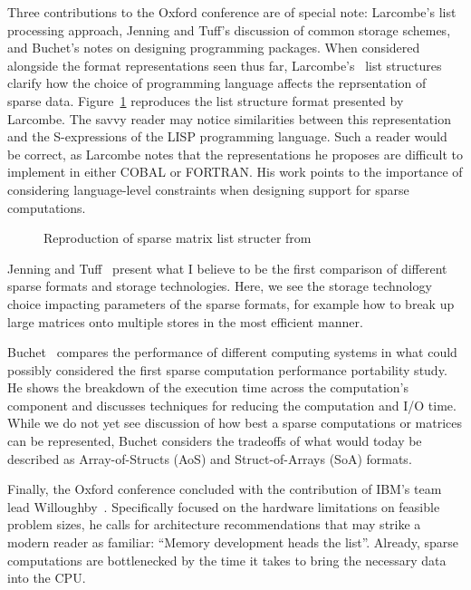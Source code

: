 Three contributions to the Oxford conference are of special note: Larcombe's list processing approach, Jenning and Tuff's discussion of common storage schemes, and Buchet's notes on designing programming packages.
When considered alongside the format representations seen thus far, Larcombe's~\cite{larcombe1971list} list structures clarify how the choice of programming language affects the reprsentation of sparse data.
Figure~\ref{listStructure} reproduces the list structure format presented by Larcombe. 
The savvy reader may notice similarities between this representation and the S-expressions of the LISP programming language.
Such a reader would be correct, as Larcombe notes that the representations he proposes are difficult to implement in either COBAL or FORTRAN. 
His work points to the importance of considering language-level constraints when designing support for sparse computations.
\begin{figure}
  \caption{Reproduction of sparse matrix list structer from~\cite{larcombe1971list}}
  \label{listStructure}
\end{figure}

Jenning and Tuff~\cite{jennings1971direct} present what I believe to be the first comparison of different sparse formats and storage technologies. 
Here, we see the storage technology choice impacting parameters of the sparse formats, for example how to break up large matrices onto multiple stores in the most efficient manner. 

Buchet~\cite{buchet1971take} compares the performance of different computing systems in what could possibly considered the first sparse computation performance portability study. 
He shows the breakdown of the execution time across the computation's component and discusses techniques for reducing the computation and I/O time. 
While we do not yet see discussion of how best a sparse computations or matrices can be represented, Buchet considers the tradeoffs of what would today be described as Array-of-Structs (AoS) and Struct-of-Arrays (SoA) formats.

Finally, the Oxford conference concluded with the contribution of IBM's team lead Willoughby~\cite{willoughby1971sparse}. Specifically focused on the hardware limitations on feasible problem sizes, he calls for architecture recommendations that may strike a modern reader as familiar: \enquote{Memory development heads the list}. 
Already, sparse computations are bottlenecked by the time it takes to bring the necessary data into the CPU. 

